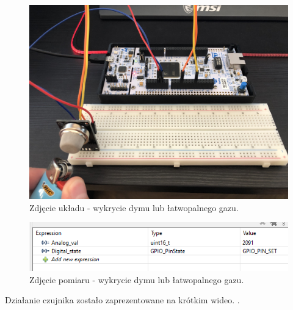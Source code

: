 \documentclass[11pt, a4paper]{article}
\begin{document}
\vspace{0.5cm}
\begin{figure}[h!]
    \centering
    \includegraphics[width=\textwidth]{fig/element/on.png}
    \caption{Zdjęcie układu - wykrycie dymu lub łatwopalnego gazu.}
    \label{fig:my_label}
\end{figure}
\vspace{0.5cm}
\begin{figure}[h!]
    \centering
    \includegraphics[width=\textwidth]{fig/element/senson.png}
    \caption{Zdjęcie pomiaru - wykrycie dymu lub łatwopalnego gazu.}
    \label{fig:my_label}
\end{figure}
\newpage
Działanie czujnika zostało zaprezentowane na krótkim wideo. \cite{youtube}.
\newpage
\printbibliography[heading=bibintoc]
\end{document}
